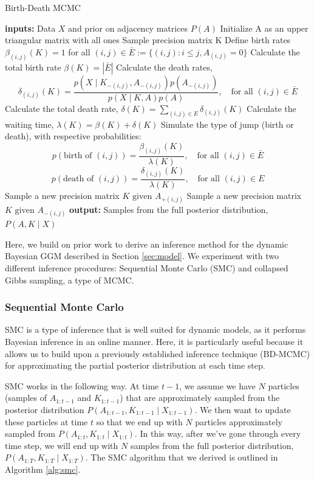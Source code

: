 \documentclass{article}
\begin{document}
\begin{algorithm}[h!tbp]
\caption{Birth-Death MCMC}
\label{alg:j}
\begin{algorithmic}[1]
\STATE \textbf{inputs:} Data $X$ and prior on adjacency matrices $P(A)$
\STATE Initialize A as an upper triangular matrix with all ones
\STATE Sample precision matrix K
\STATE Define birth rates $\beta_{(i,j)}(K) = 1$ for all $(i,j) \in \bar{E} := \{(i,j): i \leq j, A_{(i,j)} = 0\}$
\REPEAT 
\STATE Calculate the total birth rate $\beta(K) = |\bar{E}|$ 
\STATE Calculate the death rates, $$\delta_{(i,j)}(K) = \frac{p(X \mid K_{-(i,j)},A_{-(i,j)})p(A_{-(i,j)})}{p(X \mid K,A)p(A)}, \quad \text{for all }(i,j) \in \bar{E}$$
\STATE Calculate the total death rate, $\delta(K) = \sum_{(i,j) \in E} \delta_{(i,j)}(K)$
\STATE Calculate the waiting time, $\lambda(K) = \beta(K)+\delta(K)$
\STATE Simulate the type of jump (birth or death), with respective probabilities: $$ p(\text{birth of } (i,j)) = \frac{\beta_{(i,j)}(K)}{\lambda(K)}, \quad \text{for all } (i,j) \in \bar{E}$$ $$ p(\text{death of } (i,j)) = \frac{\delta_{(i,j)}(K)}{\lambda(K)}, \quad \text{for all } (i,j) \in E$$
 Sample a new precision matrix $K \text{ given } A_{+(i,j)}$ 
 Sample a new precision matrix $K \text{ given } A_{-(i,j)}$
\ENDIF
{}
\STATE \textbf{output:} Samples from the full posterior distribution, $P(A,K \mid X)$
\end{algorithmic}
\label{alg:smc}
\end{algorithm}

Here, we build on prior work to derive an inference method for the dynamic Bayesian GGM described in Section \ref{sec:model}. We experiment with two different inference procedures: Sequential Monte Carlo (SMC) and collapsed Gibbs sampling, a type of MCMC. 

\subsubsection{Sequential Monte Carlo}

SMC is a type of inference that is well suited for dynamic models, as it performs Bayesian inference in an online manner. Here, it is particularly useful because it allows us to build upon a previously established inference technique (BD-MCMC) for approximating the partial posterior distribution at each time step.

SMC works in the following way. At time $t-1$, we assume we have $N$ particles (samples of $A_{1:t-1}$ and $K_{1:t-1}$) that are approximately sampled from the posterior distribution $P(A_{1:t-1},K_{1:t-1} \mid X_{1:t-1})$. We then want to update these particles at time $t$ so that we end up with $N$ particles approximately sampled from $P(A_{1:t},K_{1:t} \mid X_{1:t})$. In this way, after we've gone through every time step, we will end up with $N$ samples from the full posterior distribution, $P(A_{1:T},K_{1:T} \mid X_{1:T})$. The SMC algorithm that we derived is outlined in Algorithm \ref{alg:smc}. 
\end{document}
